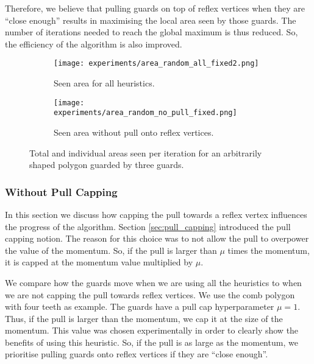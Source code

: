 Therefore, we believe that pulling guards on top of reflex vertices when they are ``close enough'' results in maximising the local area seen by those guards. The number of iterations needed to reach the global maximum is thus reduced. So, the efficiency of the algorithm is also improved.


\begin{figure}[!h]
    \begin{subfigure}{0.45\textwidth}
        \texttt{[image: experiments/area\_random\_all\_fixed2.png]}
        \caption{Seen area for all heuristics.}
        \label{fig:area_all_pull}
    \end{subfigure}
    \hfill
    \begin{subfigure}{0.45\textwidth}
        \texttt{[image: experiments/area\_random\_no\_pull\_fixed.png]}
        \caption{Seen area without pull onto reflex vertices.}
        \label{fig:area_no_pull}
    \end{subfigure}
    \caption{Total and individual areas seen per iteration for an arbitrarily shaped polygon guarded by three guards.}
    \label{fig:no_pull_plots}
\end{figure}

\subsubsection{Without Pull Capping}
In this section we  discuss how capping the pull towards a reflex vertex influences the progress of the algorithm. Section \ref{sec:pull_capping} introduced the pull capping notion. The reason for this choice was to not allow the pull to overpower the value of the momentum. So, if the pull is larger than $\mu$ times the momentum, it is capped at the momentum value multiplied by $\mu$. 

We  compare how the guards move when we are using all the heuristics to when we are not capping the pull towards reflex vertices. We  use the comb polygon with four teeth as example. The guards have a pull cap hyperparameter $\mu = 1$. Thus, if the pull is larger than the momentum, we cap it at the size of the momentum. This value was chosen experimentally in order to clearly show the benefits of using this heuristic. So, if the pull is as large as the momentum, we prioritise pulling guards onto reflex vertices if they are ``close enough''.


